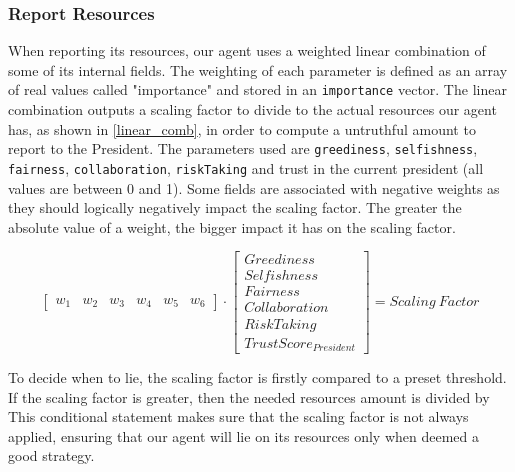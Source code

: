 \subsubsection{Report Resources} \label{reportresources}
When reporting its resources, our agent uses a weighted linear combination of some of its internal fields. The weighting of each parameter is defined as an array of real values called "importance" and stored in an \texttt{importance} vector. The linear combination outputs a scaling factor to divide to the actual resources our agent has, as shown in \eqref{linear_comb}, in order to compute a untruthful amount to report to the President. The parameters used are \texttt{greediness}, \texttt{selfishness}, \texttt{fairness}, \texttt{collaboration}, \texttt{riskTaking} and trust in the current president (all values are between 0 and 1). Some fields are associated with negative weights as they should logically negatively impact the scaling factor. The greater the absolute value of a weight, the bigger impact it has on the scaling factor.

\begin{equation}\label{linear_comb}
    \begin{bmatrix}
        w_{1}& w_{2}& w_{3}& w_{4}& w_{5}& w_{6}
    \end{bmatrix}
    \cdot
    \begin{bmatrix}
    Greediness \\ 
    Selfishness \\ 
    Fairness \\ 
    Collaboration \\ 
    RiskTaking \\
    TrustScore_{President}
    \end{bmatrix}
    = Scaling\:Factor
\end{equation}

To decide when to lie, the scaling factor is firstly compared to a preset threshold. If the scaling factor is greater, then the needed resources amount is divided by 
\begin{equation}
    [1 + (Scaling\:Factor - Preset\:Threshold)]
\end{equation} 
This conditional statement makes sure that the scaling factor is not always applied, ensuring that our agent will lie on its resources only when deemed a good strategy.

